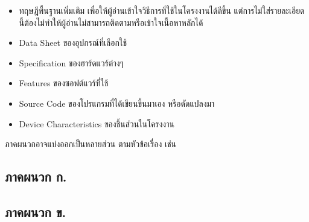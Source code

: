 \documentclass[11pt,a4paper]{article}
\begin{document}
\begin{itemize}
    \item ทฤษฎีพื้นฐานเพิ่มเติม เพื่อให้ผู้อ่านเข้าใจวิธีการที่ใช้ในโครงงานได้ดีขึ้น แต่การไม่ใส่รายละเอียดนี้ต้องไม่ทำให้ผู้อ่านไม่สามารถติดตามหรือเข้าใจเนื้อหาหลักได้
    \item Data Sheet ของอุปกรณ์ที่เลือกใช้
    \item Specification ของฮาร์ดแวร์ต่างๆ
    \item Features ของซอฟต์แวร์ที่ใช้
    \item Source Code ของโปรแกรมที่ได้เขียนขึ้นมาเอง หรือดัดแปลงมา
    \item Device Characteristics ของชิ้นส่วนในโครงงาน
\end{itemize}

ภาคผนวกอาจแบ่งออกเป็นหลายส่วน ตามหัวข้อเรื่อง เช่น

\subsection{ภาคผนวก ก.}

\subsection{ภาคผนวก ข.}
\end{document}
